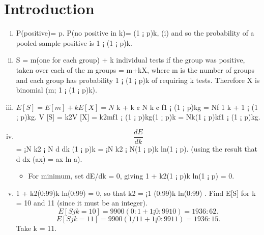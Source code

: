\documentclass[a4paper,12pt]{article}
\begin{document}
\section{Introduction}
\begin{enumerate}[(i)]
\item P(positive)= p. P(no positive in k)= (1 ¡ p)k,
(i) and so the probability of a pooled-sample positive is 1 ¡ (1 ¡ p)k.
\item S = m(one for each group) + k individual tests if the group was positive,
taken over each of the m groups = m+kX, where m is the number of groups
and each group has probability 1 ¡ (1 ¡ p)k of requiring k tests.
Therefore X is binomial (m; 1 ¡ (1 ¡ p)k).

\item $E[S] = E[m] + kE[X] = N$
k + k ¢ N
k ¢ f1 ¡ (1 ¡ p)kg = Nf 1
k + 1 ¡ (1 ¡ p)kg.
V [S] = k2V [X] = k2mf1 ¡ (1 ¡ p)kg(1 ¡ p)k = Nk(1 ¡ p)kf1 ¡ (1 ¡ p)kg.
\item 
\[ \frac{dE}{dk}\]
 = ¡N
k2 ¡ N d
dk (1 ¡ p)k = ¡N
k2 ¡ N(1 ¡ p)k ln(1 ¡ p).
(using the result that d
dx (ax) = ax ln a).
\begin{itemize}
\item For minimum, set dE/dk = 0, giving 1 + k2(1 ¡ p)k ln(1 ¡ p) = 0.
\end{itemize}
\item 1 + k2(0:99)k ln(0:99) = 0, so that k2 = ¡1
(0:99)k ln(0:99) .
Find E[S] for k = 10 and 11 (since it must be an integer).
\[E[Sjk = 10] = 9900(0:1 + 1 ¡ 0:9910) = 1936:62.\]
\[E[Sjk = 11] = 9900( 1/11 + 1 ¡ 0:9911) = 1936:15.\]
Take k = 11.
\end{enumerate}
\end{document}
